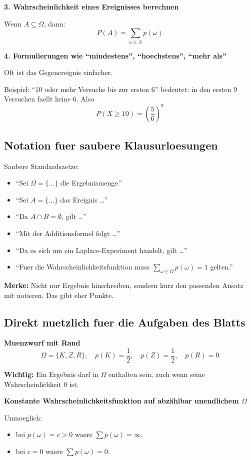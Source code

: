 \documentclass[a4paper,11pt]{article}
\begin{document}
\textbf{3. Wahrscheinlichkeit eines Ereignisses berechnen}

Wenn $A \subseteq \Omega$, dann:
\[
P(A) = \sum_{\omega \in A} p(\omega)
\]

\textbf{4. Formulierungen wie ``mindestens'', ``hoechstens'', ``mehr als''}

Oft ist das Gegenereignis einfacher.

Beispiel:
``10 oder mehr Versuche bis zur ersten 6'' bedeutet:
in den ersten 9 Versuchen faellt keine 6. Also
\[
P(X \geq 10) = \left(\frac{5}{6}\right)^9
\]

\subsection{Notation fuer saubere Klausurloesungen}
Saubere Standardsaetze:
\begin{itemize}
  \item ``Sei $\Omega = \{\dots\}$ die Ergebnismenge.''
  \item ``Sei $A = \{\dots\}$ das Ereignis \dots''
  \item ``Da $A \cap B = \emptyset$, gilt \dots''
  \item ``Mit der Additionsformel folgt \dots''
  \item ``Da es sich um ein Laplace-Experiment handelt, gilt \dots''
  \item ``Fuer die Wahrscheinlichkeitsfunktion muss $\sum_{\omega \in \Omega} p(\omega) = 1$ gelten.''
\end{itemize}

\textbf{Merke:}
Nicht nur Ergebnis hinschreiben, sondern kurz den passenden Ansatz mit notieren. Das gibt eher Punkte.

\subsection{Direkt nuetzlich fuer die Aufgaben des Blatts}
\textbf{Muenzwurf mit Rand}
\[
\Omega = \{K, Z, R\}, \quad p(K) = \frac{1}{2}, \quad p(Z) = \frac{1}{2}, \quad p(R) = 0
\]

\textbf{Wichtig:}
Ein Ergebnis darf in $\Omega$ enthalten sein, auch wenn seine Wahrscheinlichkeit $0$ ist.

\textbf{Konstante Wahrscheinlichkeitsfunktion auf abz\"ahlbar unendlichem $\Omega$}

Unmoeglich:
\begin{itemize}
  \item bei $p(\omega) = c > 0$ waere $\sum p(\omega) = \infty$,
  \item bei $c = 0$ waere $\sum p(\omega) = 0$.
\end{itemize}
\end{document}
